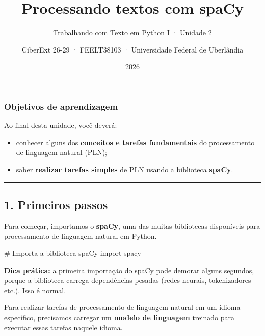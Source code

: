 \documentclass[
  brazilian,
  11pt,
]{article}
\title{Processando textos com spaCy}
\subtitle{Trabalhando com Texto em Python I · Unidade 2}
\author{CiberExt 26-29 · FEELT38103 · Universidade Federal de
Uberlândia}
\date{2026}
\newenvironment{Shaded}{\begin{snugshade}}{\end{snugshade}}
\newcommand{\CommentTok}[1]{\textcolor[rgb]{0.48,0.49,0.49}{#1}}
\newcommand{\ImportTok}[1]{\textcolor[rgb]{0.15,0.68,0.38}{#1}}
\newcommand{\NormalTok}[1]{\textcolor[rgb]{0.81,0.81,0.76}{#1}}
\providecommand{\tightlist}{%
  \setlength{\itemsep}{0pt}\setlength{\parskip}{0pt}}
\begin{document}
\maketitle

{
\setcounter{tocdepth}{2}
\tableofcontents
}
\subsubsection{Objetivos de
aprendizagem}\label{objetivos-de-aprendizagem}

Ao final desta unidade, você deverá:

\begin{itemize}
\tightlist
\item
  conhecer alguns dos \textbf{conceitos e tarefas fundamentais} do
  processamento de linguagem natural (PLN);
\item
  saber \textbf{realizar tarefas simples} de PLN usando a biblioteca
  \textbf{spaCy}.
\end{itemize}

\begin{center}\rule{0.5\linewidth}{0.5pt}\end{center}

\subsection{1. Primeiros passos}\label{primeiros-passos}

Para começar, importamos o \textbf{spaCy}, uma das muitas bibliotecas
disponíveis para processamento de linguagem natural em Python.

\begin{Shaded}
\begin{Highlighting}[]
\CommentTok{\# Importa a biblioteca spaCy}
\ImportTok{import}\NormalTok{ spacy}
\end{Highlighting}
\end{Shaded}

\begin{tipbox}

\textbf{Dica prática:} a primeira importação do spaCy pode demorar
alguns segundos, porque a biblioteca carrega dependências pesadas (redes
neurais, tokenizadores etc.). Isso é normal.

\end{tipbox}

Para realizar tarefas de processamento de linguagem natural em um idioma
específico, precisamos carregar um \textbf{modelo de linguagem} treinado
para executar essas tarefas naquele idioma.
\end{document}
